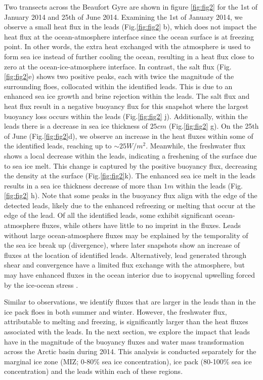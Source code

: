 \documentclass[lineno,sn-basic]{sn-jnl}%
\begin{document}
Two transects across the Beaufort Gyre are shown in figure \ref{fig:fig2} for the 1st of January 2014 and 25th of June 2014.
Examining the 1st of January 2014, we observe a small heat flux in the leads (Fig.\ref{fig:fig2} b), which does not impact the heat flux at the ocean-atmosphere interface since the ocean surface is at freezing point. 
In other words, the extra heat exchanged with the atmosphere is used to form sea ice instead of further cooling the ocean, resulting in a heat flux close to zero at the ocean-ice-atmosphere interface.
In contrast, the salt flux (Fig.\ref{fig:fig2}e) shows two positive peaks, each with twice the magnitude of the surrounding floes, collocated within the identified leads. This is due to an enhanced sea ice growth and brine rejection within the leads. 
The salt flux and heat flux result in a negative buoyancy flux for this snapshot where the largest buoyancy loss occurs within the leads (Fig.\ref{fig:fig2} j). Additionally, within the leads there is a decrease in sea ice thickness of $25cm$ (Fig.\ref{fig:fig2} g). 
On the 25th of June (Fig.\ref{fig:fig2}d), we observe an increase in the heat fluxes within some of the identified leads, reaching up to $\sim 25 W/m^2$. Meanwhile, the freshwater flux shows a local decrease within the leads, indicating a freshening of the surface due to sea ice melt. This change is captured by the positive buoyancy flux, decreasing the density at the surface (Fig.\ref{fig:fig2}k).  The enhanced sea ice melt in the leads results in a sea ice thickness decrease of more than $1m$ within the leads  (Fig.\ref{fig:fig2} h). Note that some peaks in the buoyancy flux align with the edge of the detected leads, likely due to the enhanced refreezing or melting that occur at the edge of the lead. 
Of all the identified leads, some exhibit significant ocean-atmosphere fluxes, while others have little to no imprint in the fluxes. Leads without large ocean-atmosphere fluxes may be explained by the temporality of the sea ice break up (divergence), where later snapshots show an increase of fluxes at the location of identified leads. Alternatively, lead generated through shear and convergence have a limited flux exchange with the atmosphere, but may have enhanced fluxes in the ocean interior due to isopycnal upwelling forced by the ice-ocean stress \citep{Bourgault_flux_lkf_2020}.

Similar to observations, we identify fluxes that are larger in the leads than in the ice pack floes in both summer and winter. However, the freshwater flux, attributable to melting and freezing, is significantly larger than the heat fluxes associated with the leads. In the next section, we explore the impact that leads have in the magnitude of the buoyancy fluxes and water mass transformation across the Arctic basin during 2014. This analysis is conducted separately for the marginal ice zone (MIZ; 0-80\% sea ice concentration), ice pack (80-100\% sea ice concentration) and the leads within each of these regions. 
\end{document}

